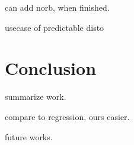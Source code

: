 \documentclass[a4paper,12pt]{report}
\begin{document}
can add norb, when finished.

usecase of predictable disto


\chapter{Conclusion}

summarize work.

compare to regression, ours easier.

future works.

{}


\nocite{lecun2004learning}
\end{document}
